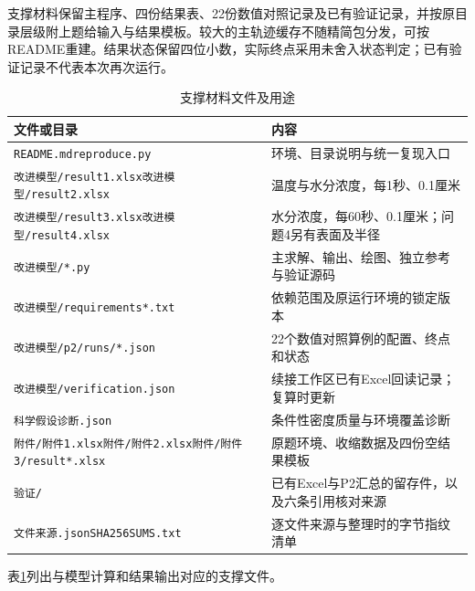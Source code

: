 支撑材料保留主程序、四份结果表、22份数值对照记录及已有验证记录，并按原目录层级附上题给输入与结果模板。较大的主轨迹缓存不随精简包分发，可按README重建。结果状态保留四位小数，实际终点采用未舍入状态判定；已有验证记录不代表本次再次运行。
\begin{longtable}{>{\raggedright\arraybackslash}p{}>{\raggedright\arraybackslash}p{}}
\caption{支撑材料文件及用途}\label{tab:support-files}\\
\toprule 文件或目录&内容\\\midrule
\texttt{README.md}\newline\texttt{reproduce.py}&环境、目录说明与统一复现入口\\
\texttt{改进模型/result1.xlsx}\newline\texttt{改进模型/result2.xlsx}&温度与水分浓度，每1秒、0.1厘米\\
\texttt{改进模型/result3.xlsx}\newline\texttt{改进模型/result4.xlsx}&水分浓度，每60秒、0.1厘米；问题4另有表面及半径\\
\texttt{改进模型/*.py}&主求解、输出、绘图、独立参考与验证源码\\
\texttt{改进模型/requirements*.txt}&依赖范围及原运行环境的锁定版本\\
\texttt{改进模型/p2/runs/*.json}&22个数值对照算例的配置、终点和状态\\
\texttt{改进模型/verification.json}&续接工作区已有Excel回读记录；复算时更新\\
\texttt{科学假设诊断.json}&条件性密度质量与环境覆盖诊断\\
\texttt{附件/附件1.xlsx}\newline\texttt{附件/附件2.xlsx}\newline\texttt{附件/附件3/result*.xlsx}&原题环境、收缩数据及四份空结果模板\\
\texttt{验证/}&已有Excel与P2汇总的留存件，以及六条引用核对来源\\
\texttt{文件来源.json}\newline\texttt{SHA256SUMS.txt}&逐文件来源与整理时的字节指纹清单\\
\bottomrule
\end{longtable}
表\ref{tab:support-files}列出与模型计算和结果输出对应的支撑文件。
